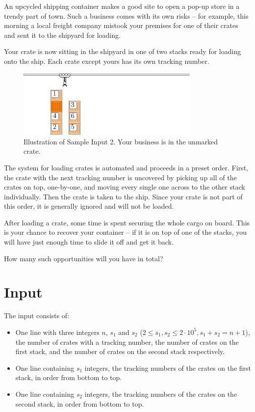 
An upcycled shipping container makes a good site to open a pop-up store in a
trendy part of town. Such a business comes with its own risks -- for example,
this morning a local freight company mistook your premises for one of their
crates and sent it to the shipyard for loading.

Your crate is now sitting in the shipyard in one of two stacks ready for
loading onto the ship. Each crate except yours has its own tracking number.

\begin{figure}[h!]
  \centering
  \includegraphics[width=0.8\textwidth]{sample}
  \caption{Illustration of Sample Input 2. Your business is in the unmarked crate.}
  \label{fig:crates}
\end{figure}
\vspace{-0.4cm}

The system for loading crates is automated and proceeds in a preset order.
First, the crate with the next tracking number is uncovered by picking up all of the crates on top,
one-by-one, and moving every single one across to the other stack individually.
Then the crate is taken to the ship. Since your crate is not part of this
order, it is generally ignored and will not be loaded.

After loading a crate, some time is spent securing the whole cargo on board.
This is your chance to
recover your container -- if it is on top of one of the stacks,
you will have just enough time to slide it off and get it back.

How many such opportunities will you have in total?

\section*{Input}
The input consists of:
\begin{itemize}
	\item One line with three integers
        $n$, $s_1$ and $s_2$ ($2 \leq s_1, s_2 \leq 2 \cdot 10^{5}, s_1 + s_2 = n + 1$),
        the number of crates with a tracking number, the number of crates on
        the first stack, and the number of crates on the second stack
        respectively.
	\item One line containing $s_1$ integers,
        the tracking numbers of the crates on the first stack, in order from bottom to top.
	\item One line containing $s_2$ integers,
        the tracking numbers of the crates on the second stack, in order from bottom to top.
\end{itemize}

